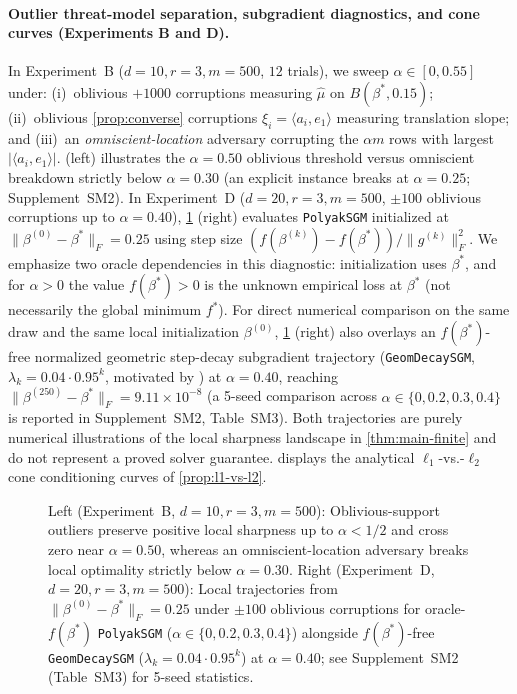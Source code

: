 \documentclass[11pt]{article}
\theoremstyle{plain}
\theoremstyle{remark}
\numberwithin{equation}{section}
\newcommand{\ip}[2]{\langle #1, #2 \rangle}
\newcommand{\Fnorm}[1]{\|#1\|_F}
\begin{document}
\paragraph{Outlier threat-model separation, subgradient diagnostics, and cone curves (Experiments B and D).}
In Experiment~B ($d = 10, r = 3, m = 500$, $12$ trials), we sweep $\alpha \in [0, 0.55]$ under: (i)~oblivious $+1000$ corruptions measuring $\hat\mu$ on $B(\beta^*, 0.15)$; (ii)~oblivious \cref{prop:converse} corruptions $\xi_i = \ip{a_i}{e_1}$ measuring translation slope; and (iii)~an \emph{omniscient-location} adversary corrupting the $\alpha m$ rows with largest $|\ip{a_i}{e_1}|$.  (left) illustrates the $\alpha = 0.50$ oblivious threshold versus omniscient breakdown strictly below $\alpha = 0.30$ (an explicit instance breaks at $\alpha = 0.25$; Supplement~SM2). In Experiment~D ($d = 20, r = 3, m = 500$, $\pm 100$ oblivious corruptions up to $\alpha = 0.40$), \cref{fig:outliers-polyak} (right) evaluates \texttt{PolyakSGM} initialized at $\Fnorm{\beta^{(0)} - \beta^*} = 0.25$ using step size $(f(\beta^{(k)}) - f(\beta^*))/\Fnorm{g^{(k)}}^2$. We emphasize two oracle dependencies in this diagnostic: initialization uses $\beta^*$, and for $\alpha > 0$ the value $f(\beta^*) > 0$ is the unknown empirical loss at $\beta^*$ (not necessarily the global minimum $f^*$). For direct numerical comparison on the same draw and the same local initialization $\beta^{(0)}$, \cref{fig:outliers-polyak} (right) also overlays an $f(\beta^*)$-free normalized geometric step-decay subgradient trajectory (\texttt{GeomDecaySGM}, $\lambda_k = 0.04 \cdot 0.95^k$, motivated by \cite{davis2024stochastic}) at $\alpha = 0.40$, reaching $\Fnorm{\beta^{(250)} - \beta^*} = 9.11 \times 10^{-8}$ (a 5-seed comparison across $\alpha \in \{0, 0.2, 0.3, 0.4\}$ is reported in Supplement~SM2, Table~SM3). Both trajectories are purely numerical illustrations of the local sharpness landscape in \cref{thm:main-finite} and do not represent a proved solver guarantee.  displays the analytical $\ell_1$-vs.-$\ell_2$ cone conditioning curves of \cref{prop:l1-vs-l2}.

\begin{figure}[t]
  \centering
  
  \caption{Left (Experiment~B, $d=10, r=3, m=500$): Oblivious-support outliers preserve positive local sharpness up to $\alpha < 1/2$ and cross zero near $\alpha = 0.50$, whereas an omniscient-location adversary breaks local optimality strictly below $\alpha = 0.30$. Right (Experiment~D, $d=20, r=3, m=500$): Local trajectories from $\Fnorm{\beta^{(0)} - \beta^*} = 0.25$ under $\pm 100$ oblivious corruptions for oracle-$f(\beta^*)$ \texttt{PolyakSGM} ($\alpha \in \{0, 0.2, 0.3, 0.4\}$) alongside $f(\beta^*)$-free \texttt{GeomDecaySGM} ($\lambda_k = 0.04 \cdot 0.95^k$) at $\alpha = 0.40$; see Supplement~SM2 (Table~SM3) for 5-seed statistics.}
  \label{fig:outliers-polyak}
\end{figure}
\end{document}
